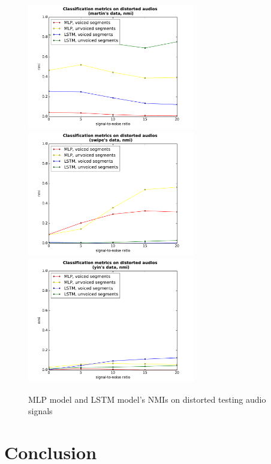 \documentclass[11pt,a4paper]{report}
\begin{document}
\begin{figure}[htbp]
  \centering
  \includegraphics[width=0.65\textwidth]{classification_metrics_martin_nmi.pdf}
  \includegraphics[width=0.65\textwidth]{classification_metrics_swipe_nmi.pdf}
  \includegraphics[width=0.65\textwidth]{classification_metrics_yin_nmi.pdf}
  \caption{MLP model and LSTM model's NMIs on distorted testing audio signals}
  \label{fig:distorted-testing-data--nmi}
\end{figure}

\chapter{Conclusion}
\end{document}
